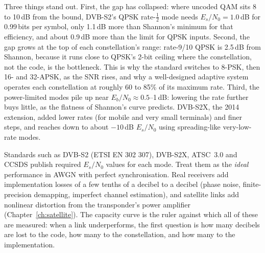 
Three things stand out. First, the gap has collapsed: where uncoded QAM sits 8 to 10\,dB from
the bound, DVB-S2's QPSK rate-$\frac12$ mode needs $E_s/N_0=1.0$\,dB for 0.99\,bits per symbol,
only 1.1\,dB more than Shannon's minimum for that efficiency, and about 0.9\,dB more than the limit
for QPSK inputs. Second, the gap grows at the top of each constellation's range: rate-9/10 QPSK is
2.5\,dB from Shannon, because it runs close to QPSK's 2-bit ceiling where the constellation, not
the code, is the bottleneck. This is why the standard switches to 8-PSK, then 16- and 32-APSK, as
the SNR rises, and why a well-designed adaptive system operates each constellation at roughly 60 to
85\% of its maximum rate. Third, the power-limited modes pile up near $E_b/N_0\approx0.5$--1\,dB:
lowering the rate further buys little, as the flatness of Shannon's curve predicts. DVB-S2X, the
2014 extension, added lower rates (for mobile and very small terminals) and finer steps, and
reaches down to about $-10$\,dB $E_s/N_0$ using spreading-like very-low-rate modes.

\begin{inpractice}
Standards such as DVB-S2 (ETSI EN 302 307), DVB-S2X, ATSC~3.0 and CCSDS publish required
$E_s/N_0$ values for each mode. Treat them as the \emph{ideal} performance in AWGN with perfect
synchronisation. Real receivers add implementation losses of a few tenths of a decibel to a
decibel (phase noise, finite-precision demapping, imperfect channel estimation), and satellite
links add nonlinear distortion from the transponder's power amplifier
(Chapter~\ref{ch:satellite}). The capacity curve is the ruler against which all of these are
measured: when a link underperforms, the first question is how many decibels are lost to the code,
how many to the constellation, and how many to the implementation.
\end{inpractice}


